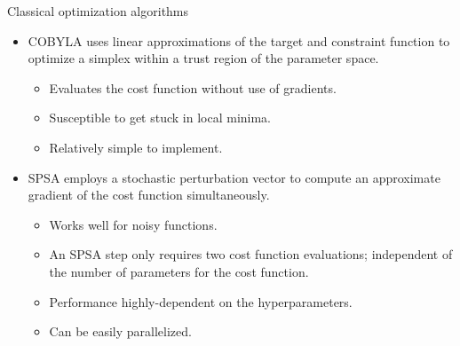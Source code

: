 \begin{frame}{Classical optimization algorithms}
  \begin{itemize}
    \setlength\itemsep{0.1em}
    \item {\color{red}COBYLA} uses linear approximations of the target and constraint function to optimize a simplex within a trust region of the parameter space.
        \begin{itemize}
          \item Evaluates the cost function without use of gradients.
          \item Susceptible to get stuck in local minima.
          \item Relatively simple to implement.
        \end{itemize}
    \item {\color{red}SPSA} employs a stochastic perturbation vector to compute an approximate gradient of the cost function simultaneously.
        \begin{itemize}
          \item Works well for noisy functions.
          \item An SPSA step only requires two cost function evaluations; independent of the number of parameters for the cost function.
          \item Performance highly-dependent on the hyperparameters.
          \item Can be easily parallelized.
        \end{itemize}
  \end{itemize}
\end{frame}
